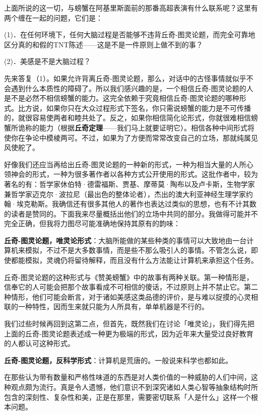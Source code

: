 \documentclass[
  12pt,
  twoside,
  openright,
  oldfontcommands,
]{memoir}
\newcommand{\heititext}[1]{{\heifamily\bfseries #1}}
\begin{document}
上面所说的这一切，与螃蟹在阿基里斯面前的那番高超表演有什么联系呢？这里有两个缠在一起的问题，它们是：

(1)．在任何环境下，任何大脑过程是否能够不违背丘奇-图灵论题，而完全可靠地区分真的和假的TNT陈述------这是不是一件原则上做不到的事？

(2)．美感是不是大脑过程？

先来答复（1）。如果允许背离丘奇-图灵论题，那么，对话中的古怪事情就似乎不会遇到什么本质性的障碍了。所以我们感兴趣的是，一个相信丘奇-图灵论题的人是不是必然不相信螃蟹的能力。这完全依赖于究竟相信丘奇-图灵论题的哪种形式。比方说，如果你只在大众过程形式下签名，你只需说螃蟹的能力是不可传播的，就很容易使两者和睦共处了。反之，如果你相信简化论形式，你就很难相信螃蟹所诡称的能力（根据\heititext{丘奇定理}------我们马上就要证明它）。相信各种中间形式将使你在争论中模棱两可。不过，如果为了方便而常常改变自己的立场，那就纯属见风使舵了。

好像我们还应当再给出丘奇-图灵论题的一种新的形式，一种为相当大量的人所心领神会的形式，一种为很多著作者以各种方式公开使用的形式。这批作者中，较为著名的有：哲学家休伯特·德雷福斯、贾基、摩蒂莫·陶布以及卢卡斯，生物学家兼哲学家迈克尔·波拉尼（最出色的整体论者），杰出的澳大利亚神经生理学家约翰·埃克勒斯。我确信还有很多其他人的著作也表达过类似的思想，也有不计其数的读者是赞同的。下面我来尽量概括出他们的立场中共同的部分。我做得可能并不完全正确，但我将力图尽可能准确地保持其原有的韵味：

\heititext{丘奇-图灵论题，唯灵论形式}：大脑所能做的某些种类的事情可以大致地由一台计算机来模拟，不过不是大多数事情，而是些不那么吸引人的事情。不管怎么说，即使都能模拟，灵魂仍将留待解释，而且没有什么方法能让计算机来承担这个任务。

丘奇-图灵论题的这种形式与《赞美螃蟹》中的故事有两种关联。第一种情形是，信奉它的人可能会把那个故事看成不可相信的傻话，不过原则上并不禁止它。第二种情形，他们可能会断言，对于诸如美感这类品德的评价，是与难以捉摸的心灵相联的一种特性，因而生来就只能为人所具有，单单机器是不行的。

我们过些时候再回到这第二点，但首先，既然我们在讨论「唯灵论」，我们得先把上面的丘奇-图灵论题表述成一种更为极端的形式，因为近年来大量受过良好教育的人都认可这种形式。

\heititext{丘奇-图灵论题，反科学形式}：计算机是荒唐的。一般说来科学也都如此。

在那些认为带有数量和严格性味道的东西是对人类价值的一种威胁的人们中间，这种观点颇为流行。真是令人遗憾，他们意识不到深究诸如人类心智等抽象结构时所包含的深刻性、复杂性和美，正是在那里，需要密切联系「人是什么」这样一个根本问题。
\end{document}
